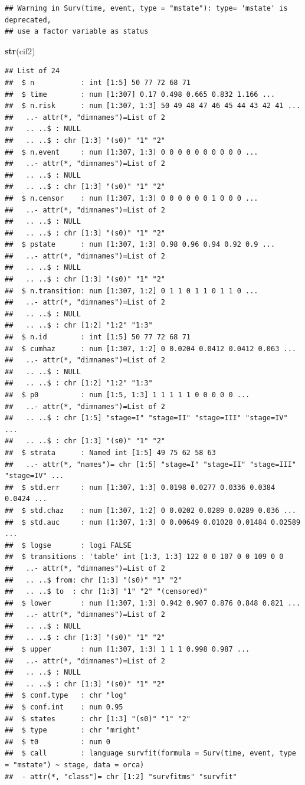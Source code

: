 \documentclass[
]{book}
\newenvironment{Shaded}{\begin{snugshade}}{\end{snugshade}}
\newcommand{\FunctionTok}[1]{\textcolor[rgb]{0.13,0.29,0.53}{\textbf{#1}}}
\newcommand{\NormalTok}[1]{#1}
\begin{document}
\begin{verbatim}
## Warning in Surv(time, event, type = "mstate"): type= 'mstate' is deprecated,
## use a factor variable as status
\end{verbatim}

\begin{Shaded}
\begin{Highlighting}[]
\FunctionTok{str}\NormalTok{(cif2)}
\end{Highlighting}
\end{Shaded}

\begin{verbatim}
## List of 24
##  $ n           : int [1:5] 50 77 72 68 71
##  $ time        : num [1:307] 0.17 0.498 0.665 0.832 1.166 ...
##  $ n.risk      : num [1:307, 1:3] 50 49 48 47 46 45 44 43 42 41 ...
##   ..- attr(*, "dimnames")=List of 2
##   .. ..$ : NULL
##   .. ..$ : chr [1:3] "(s0)" "1" "2"
##  $ n.event     : num [1:307, 1:3] 0 0 0 0 0 0 0 0 0 0 ...
##   ..- attr(*, "dimnames")=List of 2
##   .. ..$ : NULL
##   .. ..$ : chr [1:3] "(s0)" "1" "2"
##  $ n.censor    : num [1:307, 1:3] 0 0 0 0 0 0 1 0 0 0 ...
##   ..- attr(*, "dimnames")=List of 2
##   .. ..$ : NULL
##   .. ..$ : chr [1:3] "(s0)" "1" "2"
##  $ pstate      : num [1:307, 1:3] 0.98 0.96 0.94 0.92 0.9 ...
##   ..- attr(*, "dimnames")=List of 2
##   .. ..$ : NULL
##   .. ..$ : chr [1:3] "(s0)" "1" "2"
##  $ n.transition: num [1:307, 1:2] 0 1 1 0 1 1 0 1 1 0 ...
##   ..- attr(*, "dimnames")=List of 2
##   .. ..$ : NULL
##   .. ..$ : chr [1:2] "1:2" "1:3"
##  $ n.id        : int [1:5] 50 77 72 68 71
##  $ cumhaz      : num [1:307, 1:2] 0 0.0204 0.0412 0.0412 0.063 ...
##   ..- attr(*, "dimnames")=List of 2
##   .. ..$ : NULL
##   .. ..$ : chr [1:2] "1:2" "1:3"
##  $ p0          : num [1:5, 1:3] 1 1 1 1 1 0 0 0 0 0 ...
##   ..- attr(*, "dimnames")=List of 2
##   .. ..$ : chr [1:5] "stage=I" "stage=II" "stage=III" "stage=IV" ...
##   .. ..$ : chr [1:3] "(s0)" "1" "2"
##  $ strata      : Named int [1:5] 49 75 62 58 63
##   ..- attr(*, "names")= chr [1:5] "stage=I" "stage=II" "stage=III" "stage=IV" ...
##  $ std.err     : num [1:307, 1:3] 0.0198 0.0277 0.0336 0.0384 0.0424 ...
##  $ std.chaz    : num [1:307, 1:2] 0 0.0202 0.0289 0.0289 0.036 ...
##  $ std.auc     : num [1:307, 1:3] 0 0.00649 0.01028 0.01484 0.02589 ...
##  $ logse       : logi FALSE
##  $ transitions : 'table' int [1:3, 1:3] 122 0 0 107 0 0 109 0 0
##   ..- attr(*, "dimnames")=List of 2
##   .. ..$ from: chr [1:3] "(s0)" "1" "2"
##   .. ..$ to  : chr [1:3] "1" "2" "(censored)"
##  $ lower       : num [1:307, 1:3] 0.942 0.907 0.876 0.848 0.821 ...
##   ..- attr(*, "dimnames")=List of 2
##   .. ..$ : NULL
##   .. ..$ : chr [1:3] "(s0)" "1" "2"
##  $ upper       : num [1:307, 1:3] 1 1 1 0.998 0.987 ...
##   ..- attr(*, "dimnames")=List of 2
##   .. ..$ : NULL
##   .. ..$ : chr [1:3] "(s0)" "1" "2"
##  $ conf.type   : chr "log"
##  $ conf.int    : num 0.95
##  $ states      : chr [1:3] "(s0)" "1" "2"
##  $ type        : chr "mright"
##  $ t0          : num 0
##  $ call        : language survfit(formula = Surv(time, event, type = "mstate") ~ stage, data = orca)
##  - attr(*, "class")= chr [1:2] "survfitms" "survfit"
\end{verbatim}
\end{document}
